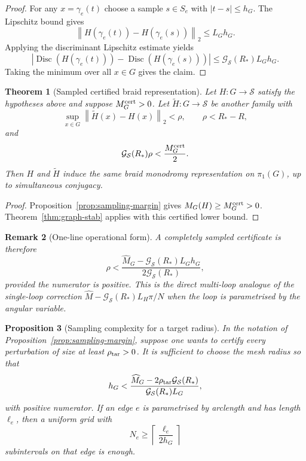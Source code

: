 \documentclass[11pt]{article}
\newtheorem{theorem}{Theorem}[section]
\newtheorem{proposition}[theorem]{Proposition}
\newtheorem{remark}[theorem]{Remark}
\numberwithin{equation}{section}
\DeclareMathOperator{\Disc}{Disc}
\newcommand{\cG}{\mathcal G}
\newcommand{\cS}{\mathcal S}
\newcommand{\norm}[1]{\left\|#1\right\|}
\newcommand{\abs}[1]{\left|#1\right|}
\newcommand{\wt}[1]{\widetilde{#1}}
\begin{document}
\begin{proof}
For any $x=\gamma_e(t)$ choose a sample $s\in S_e$ with $\abs{t-s}\le h_G$.
The Lipschitz bound gives
\[
  \norm{H(\gamma_e(t))-H(\gamma_e(s))}_2\le L_Gh_G.
\]
Applying the discriminant Lipschitz estimate yields
\[
  \abs{\Disc(H(\gamma_e(t)))-\Disc(H(\gamma_e(s)))}
  \le \cG_{\cS}(R_*)L_Gh_G.
\]
Taking the minimum over all $x\in G$ gives the claim.
\end{proof}

\begin{theorem}[Sampled certified braid representation]\label{thm:sampled-rep}
Let $H:G\to\cS$ satisfy the hypotheses above and suppose
$M_G^{\rm cert}>0$.  Let $\wt H:G\to\cS$ be another family with
\[
  \sup_{x\in G}\norm{\wt H(x)-H(x)}_2<\rho,
  \qquad \rho<R_*-R,
\]
and
\[
  \cG_{\cS}(R_*)\rho<\frac{M_G^{\rm cert}}{2}.
\]
Then $H$ and $\wt H$ induce the same braid monodromy representation on
$\pi_1(G)$, up to simultaneous conjugacy.
\end{theorem}

\begin{proof}
Proposition~\ref{prop:sampling-margin} gives
$M_G(H)\ge M_G^{\rm cert}>0$.  Theorem~\ref{thm:graph-stab} applies with
this certified lower bound.
\end{proof}

\begin{remark}[One-line operational form]
A completely sampled certificate is therefore
\[
  \rho<
  \frac{\widehat M_G-\cG_{\cS}(R_*)L_Gh_G}{2\cG_{\cS}(R_*)},
\]
provided the numerator is positive.  This is the direct multi-loop analogue
of the single-loop correction $\widehat M-\cG_{\cS}(R_*)L_H\pi/N$
when the loop is parametrised by the angular variable.
\end{remark}


\begin{proposition}[Sampling complexity for a target radius]\label{prop:sampling-complexity}
In the notation of Proposition~\ref{prop:sampling-margin}, suppose one wants
to certify every perturbation of size at least \(\rho_{\rm tar}>0\).  It is
sufficient to choose the mesh radius so that
\[
  h_G<\frac{\widehat M_G-2\rho_{\rm tar}\mathcal G_{\mathcal S}(R_*)}
  {\mathcal G_{\mathcal S}(R_*)L_G},
\]
with positive numerator.  If an edge \(e\) is parametrised by arclength and
has length \(\ell_e\), then a uniform grid with
\[
  N_e\ge
  \left\lceil\frac{\ell_e}{2h_G}\right\rceil
\]
subintervals on that edge is enough.
\end{proposition}
\end{document}

